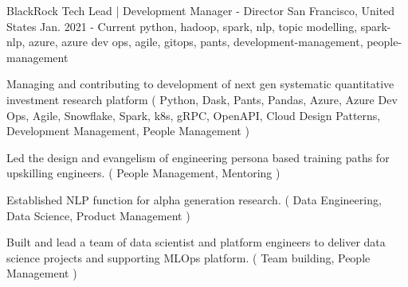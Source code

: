 \cventry
    {BlackRock} %
    {Tech Lead | Development Manager - Director} %
    {San Francisco, United States} %
    {Jan. 2021 - Current} %
    { python, hadoop, spark, nlp, topic modelling, spark-nlp, azure, azure dev ops, agile, gitops, pants, development-management, people-management} %
    {
    \begin{cvitems} %
       \item { Managing and contributing to development of next gen systematic quantitative investment research platform ( Python, Dask, Pants, Pandas, Azure, Azure Dev Ops, Agile, Snowflake, Spark, k8s, gRPC, OpenAPI, Cloud Design Patterns, Development Management, People Management ) }
       \item { Led the design and evangelism of engineering persona based training paths for upskilling engineers. ( People Management, Mentoring ) }
       \item { Established NLP function for alpha generation research. ( Data Engineering, Data Science, Product Management ) }
       \item { Built and lead a team of data scientist and platform engineers to deliver data science projects and supporting MLOps platform. ( Team building, People Management ) }
    \end{cvitems}
    }
